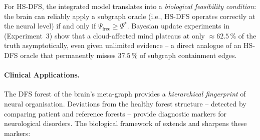 ﻿\documentclass[12pt,a4paper]{article}
\theoremstyle{plain}
\theoremstyle{definition}
\theoremstyle{remark}
\begin{document}
	For HS-DFS, the integrated model translates into a \emph{biological
		feasibility condition}: the brain can reliably apply a subgraph oracle
	(i.e., HS-DFS operates correctly at the neural level) if and only if
	$\Psi_{\mathrm{free}} \geq \Psi^*$.  Bayesian update experiments in
	\cite{epp2026brain} (Experiment~3) show that a cloud-affected mind
	plateaus at only $\approx 62.5\,\%$ of the truth asymptotically, even
	given unlimited evidence -- a direct analogue of an HS-DFS oracle that
	permanently misses $37.5\,\%$ of subgraph containment edges.
	
	\paragraph{Clinical Applications.}
	The DFS forest of the brain's meta-graph provides a \emph{hierarchical
		fingerprint} of neural organisation.  Deviations from the healthy forest
	structure -- detected by comparing patient and reference forests -- provide
	diagnostic markers for neurological disorders.  The biological framework of
	\cite{epp2026brain} extends and sharpens these markers:
\end{document}
